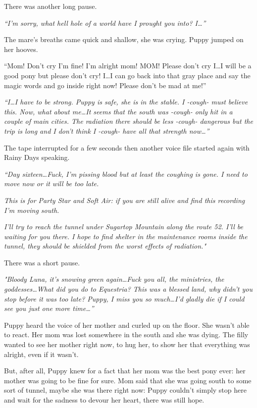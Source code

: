 There was another long pause.

\emph{``I'm sorry, what hell hole of a world have I prought you into? I\dots''}

The mare's breaths came quick and shallow, she was crying. Puppy jumped on her hooves.

``Mom! Don't cry I'm fine! I'm alright mom! MOM! Please don't cry I\dots I will be a good pony but please don't cry! I\dots I can go back into that gray place and say the magic words and go inside right now! Please don't be mad at me!''

\emph{``I\dots I have to be strong. Puppy is safe, she is in the stable. I -cough- must believe this. Now, what about me\dots It seems that the south was -cough- only hit in a couple of main cities. The radiation there should be less -cough- dangerous but the trip is long and I don't think I -cough- have all that strength now\dots''}

The tape interrupted for a few seconds then another voice file started again with Rainy Days speaking.

\emph{``Day sixteen\dots Fuck, I'm pissing blood but at least the coughing is gone. I need to move now or it will be too late.}

\emph{This is for Party Star and Soft Air: if you are still alive and find this recording I'm moving south.}

\emph{I'll try to reach the tunnel under Sugartop Mountain along the route 52. I'll be waiting for you there. I hope to find shelter in the maintenance rooms inside the tunnel, they should be shielded from the worst effects of radiation."}

There was a short pause.

\emph{"Bloody Luna, it's snowing green again\dots Fuck you all, the ministries, the goddesses\dots What did you do to Equestria? This was a blessed land, why didn't you stop before it was too late? Puppy, I miss you so much\dots I'd gladly die if I could see you just one more time\dots''}

Puppy heard the voice of her mother and curled up on the floor. She wasn't able to react. Her mom was lost somewhere in the south and she was dying. The filly wanted to see her mother right now, to hug her, to show her that everything was alright, even if it wasn't.

But, after all, Puppy knew for a fact that her mom was the best pony ever: her mother was going to be fine for sure. Mom said that she was going south to some sort of tunnel, maybe she was there right now: Puppy couldn't simply stop here and wait for the sadness to devour her heart, there was still hope.

